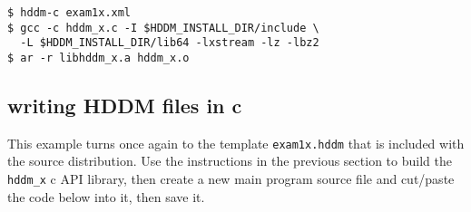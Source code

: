 \documentclass{revtex4}
\begin{document}
\vspace{0.5cm}
\begin{minipage}{12cm}
\begin{verbatim}
$ hddm-c exam1x.xml
$ gcc -c hddm_x.c -I $HDDM_INSTALL_DIR/include \
  -L $HDDM_INSTALL_DIR/lib64 -lxstream -lz -lbz2
$ ar -r libhddm_x.a hddm_x.o
\end{verbatim}
\end{minipage}
\vspace{0.5cm}

\subsection{writing HDDM files in c}

This example turns once again to the template \texttt{exam1x.hddm} that is included
with the source distribution. Use the instructions in the previous section to build
the \texttt{hddm\_x} c API library, then create a new main program source file and
cut/paste the code below into it, then save it.
\end{document}
